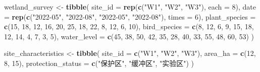 \documentclass[
]{book}
\newenvironment{Shaded}{\begin{snugshade}}{\end{snugshade}}
\newcommand{\AttributeTok}[1]{\textcolor[rgb]{0.13,0.29,0.53}{#1}}
\newcommand{\DecValTok}[1]{\textcolor[rgb]{0.00,0.00,0.81}{#1}}
\newcommand{\FunctionTok}[1]{\textcolor[rgb]{0.13,0.29,0.53}{\textbf{#1}}}
\newcommand{\NormalTok}[1]{#1}
\newcommand{\OtherTok}[1]{\textcolor[rgb]{0.56,0.35,0.01}{#1}}
\newcommand{\StringTok}[1]{\textcolor[rgb]{0.31,0.60,0.02}{#1}}
\begin{document}
\begin{Shaded}
\begin{Highlighting}[]
\NormalTok{wetland\_survey }\OtherTok{\textless{}{-}} \FunctionTok{tibble}\NormalTok{(}
  \AttributeTok{site\_id =} \FunctionTok{rep}\NormalTok{(}\FunctionTok{c}\NormalTok{(}\StringTok{"W1"}\NormalTok{, }\StringTok{"W2"}\NormalTok{, }\StringTok{"W3"}\NormalTok{), }\AttributeTok{each =} \DecValTok{8}\NormalTok{),}
  \AttributeTok{date =} \FunctionTok{rep}\NormalTok{(}\FunctionTok{c}\NormalTok{(}\StringTok{"2022{-}05"}\NormalTok{, }\StringTok{"2022{-}08"}\NormalTok{, }\StringTok{"2022{-}05"}\NormalTok{, }\StringTok{"2022{-}08"}\NormalTok{), }\AttributeTok{times =} \DecValTok{6}\NormalTok{),}
  \AttributeTok{plant\_species =} \FunctionTok{c}\NormalTok{(}\DecValTok{15}\NormalTok{, }\DecValTok{18}\NormalTok{, }\DecValTok{12}\NormalTok{, }\DecValTok{16}\NormalTok{, }\DecValTok{20}\NormalTok{, }\DecValTok{25}\NormalTok{, }\DecValTok{18}\NormalTok{, }\DecValTok{22}\NormalTok{, }\DecValTok{8}\NormalTok{, }\DecValTok{12}\NormalTok{, }\DecValTok{6}\NormalTok{, }\DecValTok{10}\NormalTok{),}
  \AttributeTok{bird\_species =} \FunctionTok{c}\NormalTok{(}\DecValTok{8}\NormalTok{, }\DecValTok{12}\NormalTok{, }\DecValTok{6}\NormalTok{, }\DecValTok{9}\NormalTok{, }\DecValTok{15}\NormalTok{, }\DecValTok{18}\NormalTok{, }\DecValTok{12}\NormalTok{, }\DecValTok{14}\NormalTok{, }\DecValTok{4}\NormalTok{, }\DecValTok{7}\NormalTok{, }\DecValTok{3}\NormalTok{, }\DecValTok{5}\NormalTok{),}
  \AttributeTok{water\_level =} \FunctionTok{c}\NormalTok{(}\DecValTok{45}\NormalTok{, }\DecValTok{38}\NormalTok{, }\DecValTok{50}\NormalTok{, }\DecValTok{42}\NormalTok{, }\DecValTok{35}\NormalTok{, }\DecValTok{28}\NormalTok{, }\DecValTok{40}\NormalTok{, }\DecValTok{33}\NormalTok{, }\DecValTok{55}\NormalTok{, }\DecValTok{48}\NormalTok{, }\DecValTok{60}\NormalTok{, }\DecValTok{53}\NormalTok{)}
\NormalTok{)}

\NormalTok{site\_characteristics }\OtherTok{\textless{}{-}} \FunctionTok{tibble}\NormalTok{(}
  \AttributeTok{site\_id =} \FunctionTok{c}\NormalTok{(}\StringTok{"W1"}\NormalTok{, }\StringTok{"W2"}\NormalTok{, }\StringTok{"W3"}\NormalTok{),}
  \AttributeTok{area\_ha =} \FunctionTok{c}\NormalTok{(}\DecValTok{12}\NormalTok{, }\DecValTok{8}\NormalTok{, }\DecValTok{15}\NormalTok{),}
  \AttributeTok{protection\_status =} \FunctionTok{c}\NormalTok{(}\StringTok{"保护区"}\NormalTok{, }\StringTok{"缓冲区"}\NormalTok{, }\StringTok{"实验区"}\NormalTok{)}
\NormalTok{)}
\end{Highlighting}
\end{Shaded}
\end{document}
